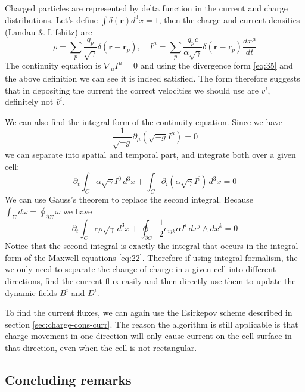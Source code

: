 Charged particles are represented by delta function in the current and charge
distributions. Let's define $\int \delta(\mathbf{r})d^3x = 1$, then the charge
and current densities (Landau \& Lifshitz) are
\begin{equation}
  \label{eq:34}
  \rho = \sum_p\frac{q_p}{\sqrt{\gamma}}\delta(\mathbf{r}-\mathbf{r}_p),\quad I^{\mu} = \sum_p\frac{q_pc}{\alpha\sqrt{\gamma}}\delta(\mathbf{r} - \mathbf{r}_p)\frac{dx^{\mu}}{dt}
\end{equation}
The continuity equation is $\nabla_{\mu}I^{\mu} = 0$ and using the divergence
form \eqref{eq:35} and the above definition we can see it is indeed satisfied.
The form therefore suggests that in depositing the current the correct
velocities we should use are $v^i$, definitely not $\bar{v}^i$.

We can also find the integral form of the continuity equation. Since we have
\begin{equation}
  \label{eq:35}
  \frac{1}{\sqrt{-g}}\partial_{\mu}\left( \sqrt{-g} I^{\mu} \right) = 0
\end{equation}
we can separate into spatial and temporal part, and integrate both over a given
cell:
\begin{equation}
  \label{eq:36}
  \partial_t\int_C \alpha\sqrt{\gamma}I^0\,d^3x + \int_C \partial_i \left( \alpha\sqrt{\gamma}I^i \right)\,d^3x = 0
\end{equation}
We can use Gauss's theorem to replace the second integral. Because $\int_{\Sigma} d\omega
= \oint_{\partial\Sigma}\omega$ we have
\begin{equation}
  \label{eq:37}
  \partial_t\int_Cc\rho\sqrt{\gamma}\,d^3x + \oint_{\partial C}\frac{1}{2}e_{ijk}\alpha I^i\,dx^j\wedge dx^k = 0
\end{equation}
Notice that the second integral is exactly the integral that occurs in the
integral form of the Maxwell equations \eqref{eq:22}. Therefore if using
integral formalism, the we only need to separate the change of charge in a given
cell into different directions, find the current flux easily and then directly
use them to update the dynamic fields $B^i$ and $D^i$.

To find the current fluxes, we can again use the Esirkepov scheme described in
section \ref{sec:charge-cons-curr}. The reason the algorithm is still applicable
is that charge movement in one direction will only cause current on the cell
surface in that direction, even when the cell is not rectangular.

\subsection{Concluding remarks}
\label{sec:gr-conclusion}

